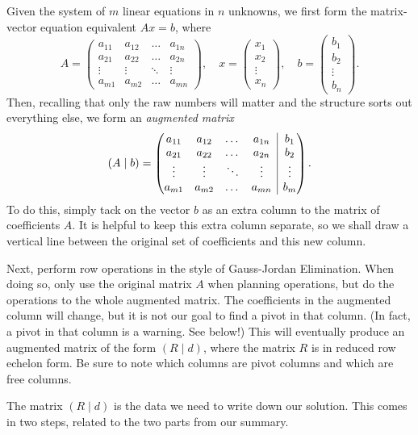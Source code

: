 \documentclass[elementsmain.tex]{subfiles}
\begin{document}
Given the system of $m$ linear equations in $n$ unknowns, we first form the matrix-vector equation equivalent $Ax=b$, where
\[
A = \begin{pmatrix} a_{11} & a_{12} & \dots & a_{1n} \\
a_{21} & a_{22} & \dots & a_{2n} \\
\vdots & \vdots & \ddots & \vdots\\
a_{m1} & a_{m2} & \dots & a_{mn}
\end{pmatrix}, \quad
x = \begin{pmatrix} x_1 \\ x_2 \\ \vdots \\ x_n \end{pmatrix}, \quad
b = \begin{pmatrix} b_1 \\ b_2 \\ \vdots \\ b_n \end{pmatrix}.
\]
Then, recalling that only the raw numbers will matter and the structure sorts out everything else, we form an \emph{augmented matrix}
\[
\left(A \mid b \right) = 
\augmatrix{cccc}{a_{11} & a_{12} & \dots & a_{1n} & b_1\\
a_{21} & a_{22} & \dots & a_{2n} & b_2 \\
\vdots & \vdots & \ddots & \vdots & \vdots \\
a_{m1} & a_{m2} & \dots & a_{mn} & b_m} .
\]
To do this, simply tack on the vector $b$ as an extra column to the matrix of coefficients $A$. It is helpful to keep this extra column separate, so we shall draw a vertical line between the original set of coefficients and this new column.

Next, perform row operations in the style of Gauss-Jordan Elimination. When doing so, only use the original matrix $A$ when planning operations, but do the operations to the whole augmented matrix. The coefficients in the augmented column will change, but it is not our goal to find a pivot in that column. (In fact, a pivot in that column is a warning. See below!) This will eventually produce an augmented matrix of the form $\left(R \mid d \right)$, where the matrix $R$ is in reduced row echelon form. Be sure to note which columns are pivot columns and which are free columns.

The matrix $\left( R \mid d\right)$ is the data we need to write down our solution. This comes in two steps, related to the two parts from our summary. 
\end{document}
